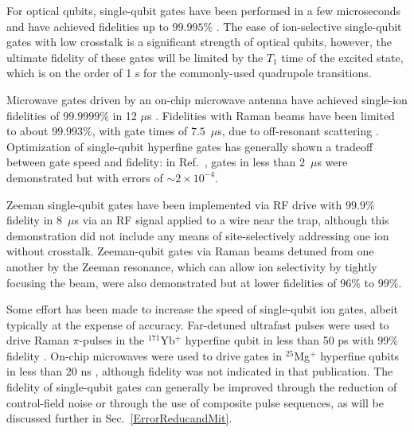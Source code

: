 \documentclass[%
12pt,
 amsmath,amssymb,
]{revtex4-2}
\begin{document}
For optical qubits, single-qubit gates have been performed in a few microseconds and have achieved fidelities up to $99.995 \%$ \cite{AkermanUniversal2015, BermudezAssessing2017}. The ease of ion-selective single-qubit gates with low crosstalk is a significant strength of optical qubits, however, the ultimate fidelity of these gates will be limited by the $T_1$ time of the excited state, which is on the order of 1 s for the commonly-used quadrupole transitions.

Microwave gates driven by an on-chip microwave antenna have achieved single-ion fidelities of $99.9999\%$ in 12 $\mu$s \cite{HartyHighFidelityIons2014}. Fidelities with Raman beams have been limited to about $99.993 \%$, with gate times of $7.5$~$\mu$s, due to off-resonant scattering \cite{Ballance2QubitHyperfineGate2016}. Optimization of single-qubit hyperfine gates has generally shown a tradeoff between gate speed and fidelity: in Ref.~\cite{Ballance2QubitHyperfineGate2016}, gates in less than $2$~$\mu$s were demonstrated but with errors of ${\sim}2 \times 10^{-4}$.

Zeeman single-qubit gates have been implemented via RF drive with $99.9 \%$ fidelity in $8$~$\mu$s \cite{KeselmanZeemanQubit2011} via an RF signal applied to a wire near the trap, although this demonstration did not include any means of site-selectively addressing one ion without crosstalk. Zeeman-qubit gates via Raman beams detuned from one another by the Zeeman resonance, which can allow ion selectivity by tightly focusing the beam, were also demonstrated \cite{PoschingerZeeman2009, Ruster2016} but at lower fidelities of $96 \%$ to $99 \%$.

Some effort has been made to increase the speed of single-qubit ion gates, albeit typically at the expense of accuracy. Far-detuned ultrafast pulses were used to drive Raman $\pi$-pulses in the $^{171}$Yb$^+$ hyperfine qubit in less than 50 ps with $99 \%$ fidelity \cite{CampbellUltrafast2010}. On-chip microwaves were used to drive gates in $^{25}$Mg$^+$ hyperfine qubits in less than 20 ns \cite{ospelkaus2011microwave}, although fidelity was not indicated in that publication.  The fidelity of single-qubit gates can generally be improved through the reduction of control-field noise or through the use of composite pulse sequences, as will be discussed further in Sec.~\ref{ErrorReducandMit}.
\end{document}
